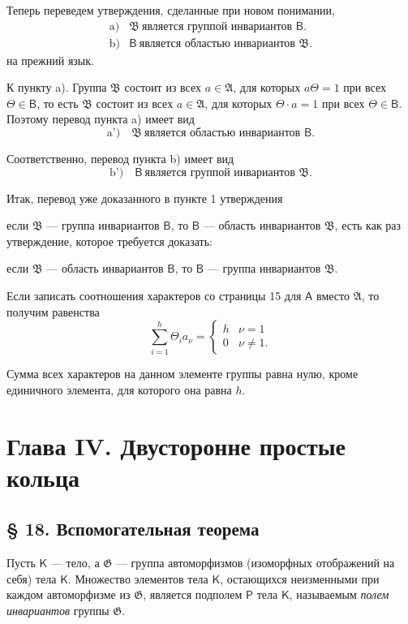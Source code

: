 \documentclass[11pt]{article}
\begin{document}
Теперь переведем утверждения, сделанные при новом понимании,
\[
\begin{array}{ll}
\text{a)}& \mathfrak B\ \text{является группой инвариантов }\mathsf B.\\
\text{b)}& \mathsf B\ \text{является областью инвариантов }\mathfrak B.
\end{array}
\]
на прежний язык.

К пункту a). Группа \(\mathfrak B\) состоит из всех \(a\in\mathfrak A\), для которых \(a\Theta=1\) при всех \(\Theta\in\mathsf B\), то есть \(\mathfrak B\) состоит из всех \(a\in\mathfrak A\), для которых \(\Theta\cdot a=1\) при всех \(\Theta\in\mathsf B\). Поэтому перевод пункта a) имеет вид
\[
\text{a')} \quad \mathfrak B\ \text{является областью инвариантов }\mathsf B.
\]

Соответственно, перевод пункта b) имеет вид
\[
\text{b')} \quad \mathsf B\ \text{является группой инвариантов }\mathfrak B.
\]

Итак, перевод уже доказанного в пункте 1 утверждения

если \(\mathfrak B\) --- группа инвариантов \(\mathsf B\), то \(\mathsf B\) --- область инвариантов \(\mathfrak B\),
есть как раз утверждение, которое требуется доказать:

если \(\mathfrak B\) --- область инвариантов \(\mathsf B\), то \(\mathsf B\) --- группа инвариантов \(\mathfrak B\).

Если записать соотношения характеров со страницы 15 для \(\mathsf A\) вместо \(\mathfrak A\), то получим равенства
\[
\sum_{i=1}^{h} \Theta_i a_\nu =
\begin{cases}
h & \nu=1\\
0 & \nu\ne 1.
\end{cases}
\]

Сумма всех характеров на данном элементе группы равна нулю, кроме единичного элемента, для которого она равна \(h\).

\section*{Глава IV. Двусторонне простые кольца}\label{kapitel-iv.-zweiseitig-einfache-ringe}

\subsection*{§ 18. Вспомогательная теорема}\label{ein-hilfssatz}

Пусть \(\mathsf K\) --- тело, а \(\mathfrak G\) --- группа автоморфизмов (изоморфных отображений на себя) тела \(\mathsf K\). Множество элементов тела \(\mathsf K\), остающихся неизменными при каждом автоморфизме из \(\mathfrak G\), является подполем \(\mathsf P\) тела \(\mathsf K\), называемым \emph{полем инвариантов} группы \(\mathfrak G\).
\end{document}
